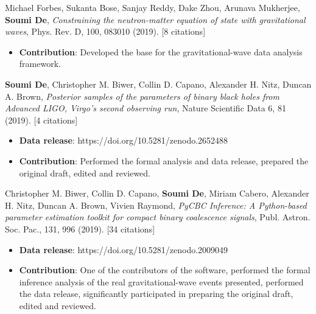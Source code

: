 \begin{etaremune}
\item{Michael Forbes, Sukanta Bose, Sanjay Reddy, Dake Zhou, Arunava Mukherjee, \textbf{Soumi De}, \textit{Constraining the neutron-matter equation of state with gravitational waves}, Phys. Rev. D, 100, 083010 (2019). [8 citations]
\begin{itemize}
\vspace{-2mm}
\item \textbf{Contribution}:
    Developed the base for the gravitational-wave data analysis framework.
\end{itemize}
}
\item{\textbf{Soumi De}, Christopher M. Biwer, Collin D. Capano, Alexander H. Nitz, Duncan A. Brown, \textit{Posterior samples of the parameters of binary black holes from Advanced LIGO, Virgo's second observing run}, Nature Scientific Data 6, 81 (2019). [4 citations]
\begin{itemize}
\vspace{-2mm}
    \item \textbf{Data release}: https://doi.org/10.5281/zenodo.2652488
\vspace{-1mm}
\item \textbf{Contribution}:
    Performed the formal analysis and data release, %
    prepared the original draft, edited and reviewed.
\end{itemize}
}

\item{Christopher M. Biwer, Collin D. Capano, \textbf{Soumi De}, Miriam Cabero, Alexander H. Nitz, Duncan A. Brown, Vivien Raymond, \textit{PyCBC Inference: A Python-based parameter estimation toolkit for compact binary coalescence signals}, Publ. Astron. Soc. Pac., 131, 996 (2019). [34 citations]
\begin{itemize}
\vspace{-2mm}
    \item \textbf{Data release}: https://doi.org/10.5281/zenodo.2009049
    \vspace{-1mm}
    \item \textbf{Contribution}:
    One of the contributors of the software, performed the formal inference analysis of the real gravitational-wave events presented, performed the data release, significantly participated in preparing the original draft, edited and reviewed.
\end{itemize}
}


\end{etaremune}
